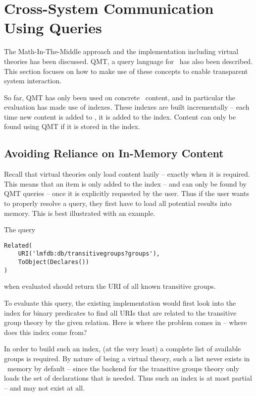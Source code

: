 \section{Cross-System Communication Using Queries}\label{sec:comm}

The Math-In-The-Middle approach and the implementation including virtual theories has been discussed. 
QMT, a query language for \mmt\ has also been described. 
This section focuses on how to make use of these concepts to enable transparent system interaction. 

So far, QMT has only been used on concrete \mmt\ content, and in particular the evaluation has made use of indexes. 
These indexes are built incrementally -- each time new content is added to \mmt, it is added to the index. 
Content can only be found using QMT if it is stored in the index. 

\subsection{Avoiding Reliance on In-Memory Content}\label{sec:comm:reliance}

Recall that virtual theories only load content lazily -- exactly when it is required. 
This means that an item is only added to the index -- and can only be found by QMT queries -- once it is explicitly requested by the user. 
Thus if the user wants to properly resolve a query, they first have to load all potential results into \mmt memory. 
This is best illustrated with an example. 

\begin{example}\label{example:lmfdbhard}
	The query \begin{lstlisting}[language=qmt]
Related(
	URI('lmfdb:db/transitivegroups?groups'),
	ToObject(Declares())
)
	\end{lstlisting} when evaluated should return the URI of all known transitive groups.
\end{example}

To evaluate this query, the existing implementation would first look into the index for binary predicates to find all URIs that are related to the transitive group theory by the given  relation.
Here is where the problem comes in -- where does this index come from?

In order to build such an index, (at the very least) a complete list of available groups is required.
By nature of being a virtual theory, such a list never exists in \mmt\ memory by default -- since the backend for the transitive groups theory only loads the set of declarations that is needed.
Thus such an index is at most partial -- and may not exist at all.

